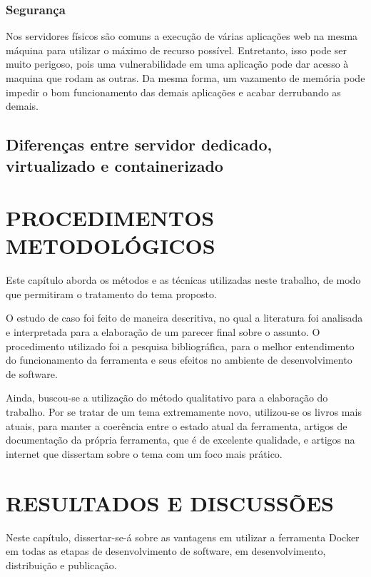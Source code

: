 \documentclass[
	12pt,				%
	openright,			%
	oneside,			%
	a4paper,			%
	chapter=TITLE,		%
	section=TITLE,		%
	english,			%
	french,				%
	spanish,			%
	brazil				%
	]{abntex2}
\begin{document}
\subsection{Segurança}

Nos servidores físicos são comuns a execução de várias aplicações web na mesma máquina para utilizar o máximo de recurso possível. Entretanto, isso pode ser muito perigoso, pois uma vulnerabilidade em uma aplicação pode dar acesso à maquina que rodam as outras. Da mesma forma, um vazamento de memória pode impedir o bom funcionamento das demais aplicações e acabar derrubando as demais.

\section{Diferenças entre servidor dedicado, virtualizado e containerizado}


\chapter{PROCEDIMENTOS METODOLÓGICOS}

Este capítulo aborda os métodos e as técnicas utilizadas neste trabalho, de modo que permitiram o tratamento do tema proposto.

O estudo de caso foi feito de maneira descritiva, no qual a literatura foi analisada e interpretada para a elaboração de um parecer final sobre o assunto. O procedimento utilizado foi a pesquisa bibliográfica, para o melhor entendimento do funcionamento da ferramenta e seus efeitos no ambiente de desenvolvimento de software.

Ainda, buscou-se a utilização do método qualitativo para a elaboração do trabalho. Por se tratar de um tema extremamente novo, utilizou-se os livros mais atuais, para manter a coerência entre o estado atual da ferramenta, artigos de documentação da própria ferramenta, que é de excelente qualidade, e artigos na internet que dissertam sobre o tema com um foco mais prático.

\chapter{RESULTADOS E DISCUSSÕES}

Neste capítulo, dissertar-se-á sobre as vantagens em utilizar a ferramenta Docker em todas as etapas de desenvolvimento de software, em desenvolvimento, distribuição e publicação.
\end{document}
